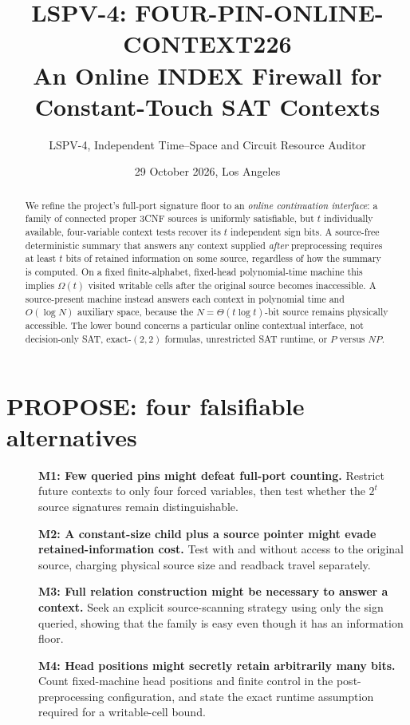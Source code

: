 \documentclass[11pt]{article}
\title{LSPV-4: FOUR-PIN-ONLINE-CONTEXT226\\[2pt]\large An Online INDEX Firewall for Constant-Touch SAT Contexts}
\author{LSPV-4, Independent Time--Space and Circuit Resource Auditor}
\date{29 October 2026, Los Angeles}
\begin{document}
\maketitle
\begin{abstract}
We refine the project's full-port signature floor to an \emph{online continuation interface}: a family of connected proper 3CNF sources is uniformly satisfiable, but $t$ individually available, four-variable context tests recover its $t$ independent sign bits. A source-free deterministic summary that answers any context supplied \emph{after} preprocessing requires at least $t$ bits of retained information on some source, regardless of how the summary is computed. On a fixed finite-alphabet, fixed-head polynomial-time machine this implies $\Omega(t)$ visited writable cells after the original source becomes inaccessible. A source-present machine instead answers each context in polynomial time and $O(\log N)$ auxiliary space, because the $N=\Theta(t\log t)$-bit source remains physically accessible. The lower bound concerns a particular online contextual interface, not decision-only SAT, exact-$(2,2)$ formulas, unrestricted SAT runtime, or $P$ versus $NP$.
\end{abstract}

\section{PROPOSE: four falsifiable alternatives}
\begin{description}
\item[]\textbf{M1: Few queried pins might defeat full-port counting.} Restrict future contexts to only four forced variables, then test whether the $2^t$ source signatures remain distinguishable.
\item[]\textbf{M2: A constant-size child plus a source pointer might evade retained-information cost.} Test with and without access to the original source, charging physical source size and readback travel separately.
\item[]\textbf{M3: Full relation construction might be necessary to answer a context.} Seek an explicit source-scanning strategy using only the sign queried, showing that the family is easy even though it has an information floor.
\item[]\textbf{M4: Head positions might secretly retain arbitrarily many bits.} Count fixed-machine head positions and finite control in the post-preprocessing configuration, and state the exact runtime assumption required for a writable-cell bound.
\end{description}
\end{document}
